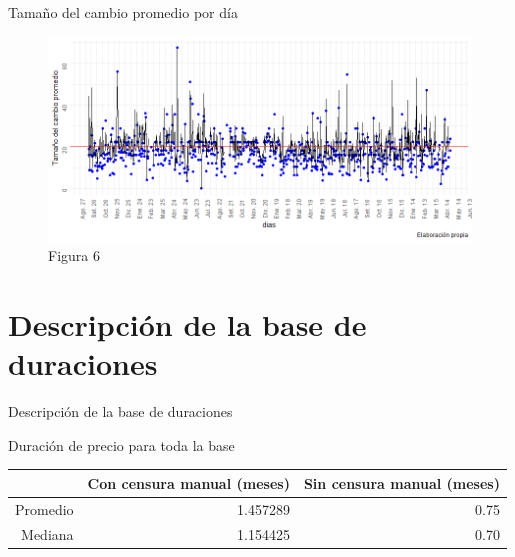 \documentclass[xcolor=dvipsnames]{beamer}
\begin{document}

\begin{frame}
Tamaño del cambio promedio por d\'ia
\begin{figure}
\includegraphics[scale=0.50]{tamano_cambio_promedio.png}
\caption{Figura 6}
\end{figure}
\end{frame}


\section{Descripci\'on de la base de duraciones}

\begin{frame}
Descripci\'on de la base de duraciones
\end{frame}


\begin{frame}
Duraci\'on de precio para toda la base
\centering
\begin{tabular}{rrr}
\toprule
 & Con censura manual (meses) & Sin censura manual (meses)\\
\midrule
Promedio & 1.457289 & 0.75 \\ Mediana & 1.154425 & 0.70\\
\bottomrule
\end{tabular}
\end{frame}
\end{document}
